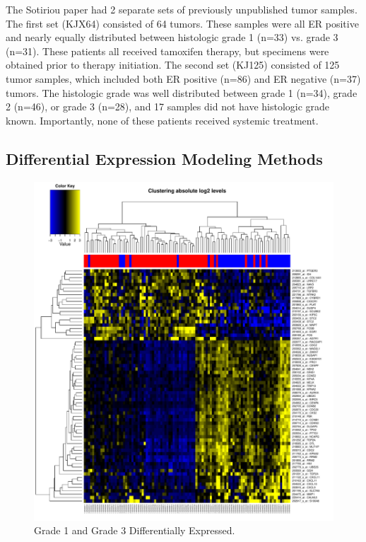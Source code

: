 \documentclass[a4paper,10pt]{article}
\begin{document}
The Sotiriou paper had 2 separate sets of previously unpublished tumor samples. 
The first set (KJX64) consisted of 64 tumors. These samples were all ER positive 
and nearly equally distributed between histologic grade 1 (n=33) vs. grade 3 (n=31). 
These patients all received tamoxifen therapy, but specimens were obtained prior to 
therapy initiation. The second set (KJ125) consisted of 125 tumor samples, which 
included both ER positive (n=86) and ER negative (n=37) tumors. The histologic 
grade was well distributed between grade 1 (n=34), grade 2 (n=46), or grade 3 (n=28), 
and 17 samples did not have histologic grade known. Importantly, none of these patients
 received systemic treatment.


\subsection{Differential Expression Modeling Methods}
\begin{figure}
\centering
\includegraphics[scale=0.43]{docs/grade1and3differentiallyexpressed}
\caption{Grade 1 and Grade 3 Differentially Expressed.}\label{grade13diff}
\end{figure}
\end{document}

